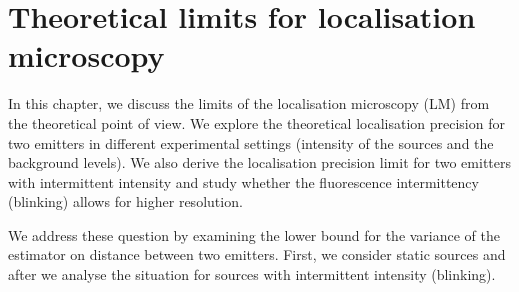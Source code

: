 \chapter{Theoretical limits for localisation microscopy \label{sec:Theoretical-limits-of the LM}}

%
%
%
%
%
%
%
%
%
%

In this chapter, we discuss the limits of the localisation microscopy (LM) from the theoretical point of view. We explore the theoretical localisation precision for two emitters in different experimental settings (intensity of the sources and the background levels). We also derive the localisation precision limit for two emitters with intermittent intensity and study whether the fluorescence intermittency (blinking) allows for higher resolution.

We address these question by examining the \CR lower bound for the variance of the estimator on distance between two emitters. First, we consider static sources and after we analyse the situation for sources with intermittent intensity (blinking). 

